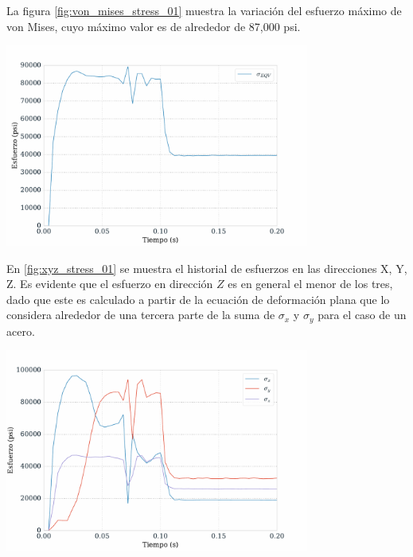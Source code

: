 La figura \ref{fig:von_mises_stress_01} muestra la variación del esfuerzo máximo 
de von Mises, cuyo máximo valor es de alrededor de 87,000 psi.

\begin{center}
\includegraphics[width=0.75\textwidth]{src/ch4/von_mises_stress_01.pdf}
\label{fig:von_mises_stress_01}
\end{center}

En \ref{fig:xyz_stress_01} se muestra el historial de esfuerzos en las direcciones 
X, Y, Z. Es evidente que el esfuerzo en dirección $Z$ es en general el menor de 
los tres, dado que este es calculado a partir de la ecuación de deformación plana 
que lo considera alrededor de una tercera parte de la suma de $\sigma_x$ y $\sigma_y$ para 
el caso de un acero. \\

\begin{center}
\includegraphics[width=0.75\textwidth]{src/ch4/xyz_stress_01.pdf}
\label{fig:xyz_stress_01}
\end{center}

